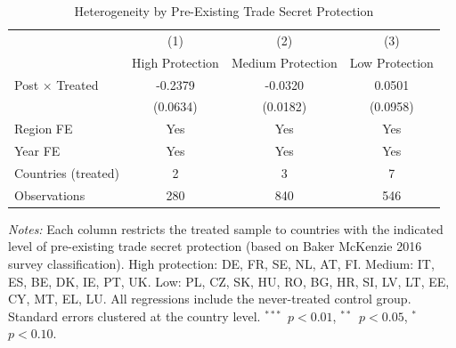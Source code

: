 \begin{table}[htbp]
\centering
\caption{Heterogeneity by Pre-Existing Trade Secret Protection}
\label{tab:heterogeneity}
\begin{tabular}{lccc}
\hline\hline
 & (1) & (2) & (3) \\
 & High Protection & Medium Protection & Low Protection \\
\hline
Post $\times$ Treated & -0.2379 & -0.0320 & 0.0501 \\
 & (0.0634) & (0.0182) & (0.0958) \\
\hline
Region FE & Yes & Yes & Yes \\
Year FE & Yes & Yes & Yes \\
Countries (treated) & 2 & 3 & 7 \\
Observations & 280 & 840 & 546 \\
\hline\hline
\end{tabular}
\begin{tablenotes}[flushleft]
\small
\item \textit{Notes:} Each column restricts the treated sample to countries with the indicated level of pre-existing trade secret protection (based on Baker McKenzie 2016 survey classification). High protection: DE, FR, SE, NL, AT, FI. Medium: IT, ES, BE, DK, IE, PT, UK. Low: PL, CZ, SK, HU, RO, BG, HR, SI, LV, LT, EE, CY, MT, EL, LU. All regressions include the never-treated control group. Standard errors clustered at the country level. $^{***}$~$p<0.01$, $^{**}$~$p<0.05$, $^{*}$~$p<0.10$.
\end{tablenotes}
\end{table}
